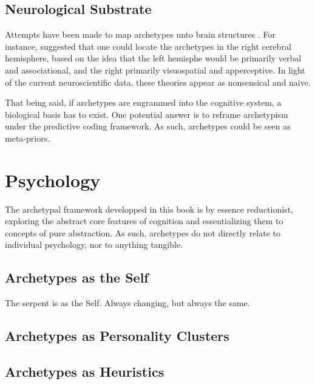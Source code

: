 \documentclass[
]{book}
\begin{document}
\hypertarget{neurological-substrate}{%
\subsection{Neurological Substrate}\label{neurological-substrate}}

Attempts have been made to map archetypes unto brain structures \citep{samuels2003jung}. For instance, \citet{rossi1977cerebral} suggested that one could locate the archetypes in the right cerebral hemisphere, based on the idea that the left hemisphe would be primarily verbal and associational, and the right primarily visuospatial and apperceptive. In light of the current neuroscientific data, these theories appear as nonsensical and naive.

That being said, if archetypes are engrammed into the cognitive system, a biological basis has to exist. One potential answer is to reframe archetypism under the predictive coding framework. As such, archetypes could be seen as meta-priors.

\hypertarget{psychology}{%
\section{Psychology}\label{psychology}}

The archetypal framework developped in this book is by essence reductionist, exploring the abstract core features of cognition and essentializing them to concepts of pure abstraction. As such, archetypes do not directly relate to individual psychology, nor to anything tangible.

\hypertarget{archetypes-as-the-self}{%
\subsection{Archetypes as the Self}\label{archetypes-as-the-self}}

The serpent is as the Self. Always changing, but always the same.

\hypertarget{archetypes-as-personality-clusters}{%
\subsection{Archetypes as Personality Clusters}\label{archetypes-as-personality-clusters}}

\hypertarget{archetypes-as-heuristics}{%
\subsection{Archetypes as Heuristics}\label{archetypes-as-heuristics}}
\end{document}
